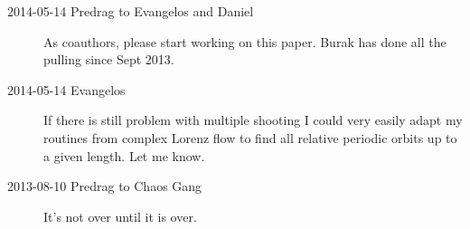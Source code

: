 \begin{description}
\item[2014-05-14 Predrag to Evangelos and Daniel] As coauthors, please start
working on this paper. Burak has done all the pulling since Sept 2013.

\item[2014-05-14 Evangelos] If there is still problem with multiple shooting
I could very easily adapt my routines from complex Lorenz flow to find
all relative periodic orbits up to a given length. Let me know.



\item[2013-08-10  Predrag to Chaos Gang] It's not over until it is over.

\end{description}
